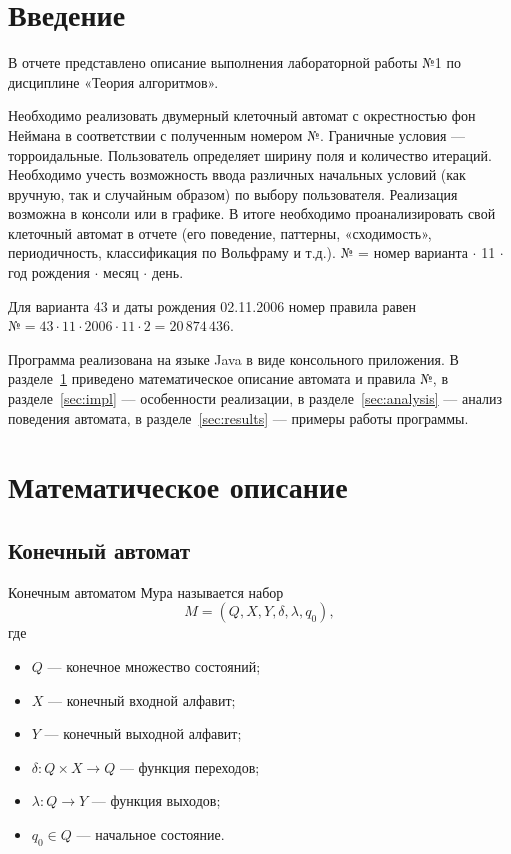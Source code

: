 \documentclass[a4paper,14pt]{extarticle}
\begin{document}
\section*{Введение}
{}

В отчете представлено описание выполнения лабораторной работы №1 по дисциплине «Теория алгоритмов».

Необходимо реализовать двумерный клеточный автомат с окрестностью фон Неймана в соответствии с полученным номером №. Граничные условия --- торроидальные. Пользователь определяет ширину поля и количество итераций. Необходимо учесть возможность ввода различных начальных условий (как вручную, так и случайным образом) по выбору пользователя. Реализация возможна в консоли или в графике. В итоге необходимо проанализировать свой клеточный автомат в отчете (его поведение, паттерны, «сходимость», периодичность, классификация по Вольфраму и т.д.).
№ = номер варианта $\cdot$ 11 $\cdot$ год рождения $\cdot$ месяц $\cdot$ день.

Для варианта 43 и даты рождения 02.11.2006 номер правила равен $\text{№} = 43 \cdot 11 \cdot 2006 \cdot 11 \cdot 2 = 20\,874\,436.$

Программа реализована на языке Java в виде консольного приложения. В разделе~\ref{sec:math} приведено математическое описание автомата и правила №, в разделе~\ref{sec:impl} --- особенности реализации, в разделе~\ref{sec:analysis} --- анализ поведения автомата, в разделе~\ref{sec:results} --- примеры работы программы.

\newpage
\section{Математическое описание}
\label{sec:math}

\subsection{Конечный автомат}

Конечным автоматом Мура называется набор
\[
	M = (Q, X, Y, \delta, \lambda, q_0),
\]
где
\begin{itemize}
	\item $Q$ --- конечное множество состояний;
	\item $X$ --- конечный входной алфавит;
	\item $Y$ --- конечный выходной алфавит;
	\item $\delta: Q \times X \to Q$ --- функция переходов;
	\item $\lambda: Q \to Y$ --- функция выходов;
	\item $q_0 \in Q$ --- начальное состояние.
\end{itemize}
\end{document}
